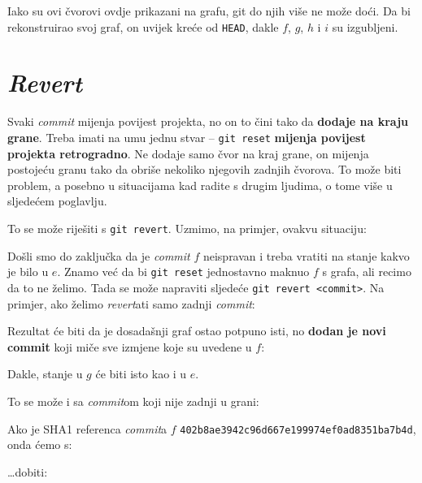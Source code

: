

Iako su ovi čvorovi ovdje prikazani na grafu, git do njih više ne može doći.
Da bi rekonstruirao svoj graf, on uvijek kreće od \verb+HEAD+, dakle $f$, $g$, $h$ i $i$ su izgubljeni.

\section*{\emph{Revert}}

Svaki \emph{commit} mijenja povijest projekta, no on to čini tako da \textbf{dodaje na kraju grane}.
Treba imati na umu jednu stvar -- \verb+git reset+ \textbf{mijenja povijest projekta retrogradno}.
Ne dodaje samo čvor na kraj grane, on mijenja postojeću granu tako da obriše nekoliko njegovih zadnjih čvorova.
To može biti problem, a posebno u situacijama kad radite s drugim ljudima, o tome više u sljedećem poglavlju.

To se može riješiti s \verb+git revert+. Uzmimo, na primjer, ovakvu situaciju:



Došli smo do zaključka da je \emph{commit} $f$ neispravan i treba vratiti na stanje kakvo je bilo u $e$.
Znamo već da bi \verb+git reset+ jednostavno maknuo $f$ s grafa, ali recimo da to ne želimo.
Tada se može napraviti sljedeće \verb+git revert <commit>+. 
Na primjer, ako želimo \emph{revert}ati samo zadnji \emph{commit}:


Rezultat će biti da je dosadašnji graf ostao potpuno isti, no \textbf{dodan je novi commit} koji miče sve izmjene koje su uvedene u $f$:



Dakle, stanje u $g$ će biti isto kao i u $e$.

To se može i sa \emph{commit}om koji nije zadnji u grani:



Ako je SHA1 referenca \emph{commit}a $f$ \verb+402b8ae3942c96d667e199974ef0ad8351ba7b4d+, onda ćemo s:


\dots{}dobiti:



